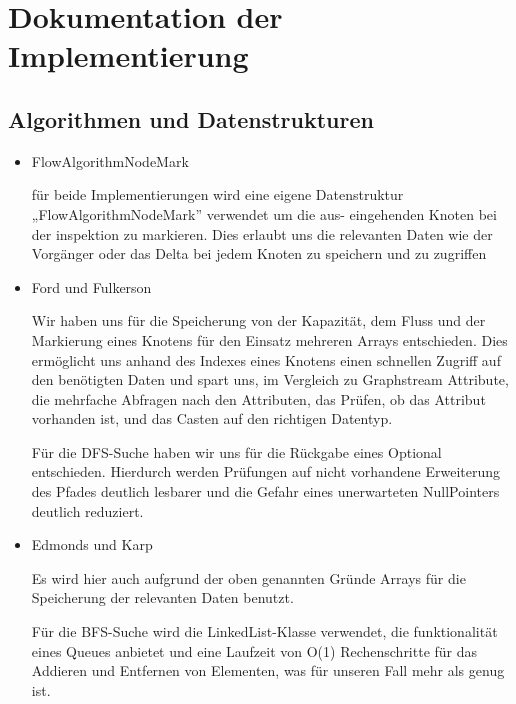 \documentclass[a4paper]{article}
\begin{document}
	

\newpage

\newenvironment{answer}{\par\normalfont}{}

\section{Dokumentation der Implementierung}\label{sec:dokumentation-der-implementierung}

\subsection{Algorithmen und Datenstrukturen}\label{subsec:algorithmen-und-datenstrukturen}

\begin{itemize}
	\item FlowAlgorithmNodeMark \label{itm:FlowAlgorithmNodeMark}
		\begin{answer}
			für beide Implementierungen wird eine eigene Datenstruktur „FlowAlgorithmNodeMark'' verwendet um die aus- eingehenden Knoten bei der inspektion zu markieren.
			Dies erlaubt uns die relevanten Daten wie der Vorgänger oder das Delta bei jedem Knoten zu speichern und zu zugriffen
		\end{answer}
	\item Ford und Fulkerson
		\begin{answer}
			Wir haben uns für die Speicherung von der Kapazität, dem Fluss und der Markierung eines Knotens für den Einsatz mehreren Arrays entschieden.
			Dies ermöglicht uns anhand des Indexes eines Knotens einen schnellen Zugriff auf den benötigten Daten und spart uns, im Vergleich zu Graphstream Attribute, die mehrfache Abfragen nach den Attributen, das Prüfen, ob das Attribut vorhanden ist, und das Casten auf den richtigen Datentyp.

			Für die DFS-Suche haben wir uns für die Rückgabe eines Optional entschieden.
			Hierdurch werden Prüfungen auf nicht vorhandene Erweiterung des Pfades deutlich lesbarer und die Gefahr eines unerwarteten NullPointers deutlich reduziert.
		\end{answer}
	\item Edmonds und Karp
		\begin{answer}
			Es wird hier auch aufgrund der oben genannten Gründe Arrays für die Speicherung der relevanten Daten benutzt.

			Für die BFS-Suche wird die LinkedList-Klasse verwendet, die funktionalität eines Queues anbietet und eine Laufzeit von O(1) Rechenschritte für das Addieren und Entfernen von Elementen, was für unseren Fall mehr als genug ist.
		\end{answer}
\end{itemize}
\end{document}
